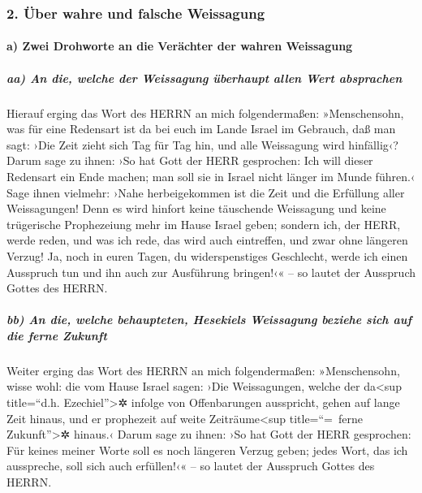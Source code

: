 \hypertarget{uxfcber-wahre-und-falsche-weissagung}{%
\subsubsection{2. Über wahre und falsche
Weissagung}\label{uxfcber-wahre-und-falsche-weissagung}}

\hypertarget{a-zwei-drohworte-an-die-veruxe4chter-der-wahren-weissagung}{%
\paragraph{a) Zwei Drohworte an die Verächter der wahren
Weissagung}\label{a-zwei-drohworte-an-die-veruxe4chter-der-wahren-weissagung}}

\hypertarget{aa-an-die-welche-der-weissagung-uxfcberhaupt-allen-wert-absprachen}{%
\subparagraph{aa) An die, welche der Weissagung überhaupt allen Wert
absprachen}\label{aa-an-die-welche-der-weissagung-uxfcberhaupt-allen-wert-absprachen}}

Hierauf erging das Wort des HERRN an mich folgendermaßen:
»Menschensohn, was für eine Redensart ist da bei euch im
Lande Israel im Gebrauch, daß man sagt: ›Die Zeit zieht sich Tag für Tag
hin, und alle Weissagung wird hinfällig‹? Darum sage zu
ihnen: ›So hat Gott der HERR gesprochen: Ich will dieser Redensart ein
Ende machen; man soll sie in Israel nicht länger im Munde führen.‹ Sage
ihnen vielmehr: ›Nahe herbeigekommen ist die Zeit und die Erfüllung
aller Weissagungen! Denn es wird hinfort keine täuschende
Weissagung und keine trügerische Prophezeiung mehr im Hause Israel
geben; sondern ich, der HERR, werde reden, und was ich
rede, das wird auch eintreffen, und zwar ohne längeren Verzug! Ja, noch
in euren Tagen, du widerspenstiges Geschlecht, werde ich einen Ausspruch
tun und ihn auch zur Ausführung bringen!‹« -- so lautet der Ausspruch
Gottes des HERRN.

\hypertarget{bb-an-die-welche-behaupteten-hesekiels-weissagung-beziehe-sich-auf-die-ferne-zukunft}{%
\subparagraph{bb) An die, welche behaupteten, Hesekiels Weissagung
beziehe sich auf die ferne
Zukunft}\label{bb-an-die-welche-behaupteten-hesekiels-weissagung-beziehe-sich-auf-die-ferne-zukunft}}

Weiter erging das Wort des HERRN an mich folgendermaßen:
»Menschensohn, wisse wohl: die vom Hause Israel sagen:
›Die Weissagungen, welche der da\textless sup title=``d.h.
Ezechiel''\textgreater✲ infolge von Offenbarungen ausspricht, gehen auf
lange Zeit hinaus, und er prophezeit auf weite Zeiträume\textless sup
title=``=~ferne Zukunft''\textgreater✲ hinaus.‹ Darum
sage zu ihnen: ›So hat Gott der HERR gesprochen: Für keines meiner Worte
soll es noch längeren Verzug geben; jedes Wort, das ich ausspreche, soll
sich auch erfüllen!‹« -- so lautet der Ausspruch Gottes des HERRN.

